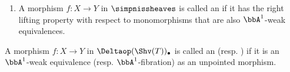 \begin{definition}
\begin{enumerate}
        \item A morphism $f: X \to Y$ in $\simpnissheaves$ is called an  if it has the right lifting property with respect to monomorphisms that are also $\bbA^1$-weak equivalences.

    \end{enumerate}
    A morphism $f: X \to Y$ in $\Deltaop(\Shv(T))_\bullet$ is called an  (resp. ) if it is an $\bbA^1$-weak equivalence (resp. $\bbA^1$-fibration) as an unpointed morphism.
\end{definition}
